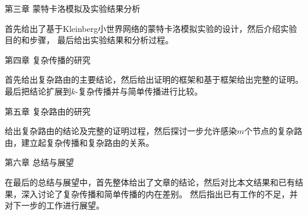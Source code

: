 第三章 蒙特卡洛模拟及实验结果分析

首先给出了基于Kleinberg小世界网络的蒙特卡洛模拟实验的设计，然后介绍实验目的和步骤，
最后给出实验结果和分析过程。

第四章 复杂传播的研究

首先给出复杂路由的主要结论，然后给出证明的框架和基于框架给出完整的证明。
最后把结论扩展到$k$-复杂传播并与简单传播进行比较。


第五章 复杂路由的研究

给出复杂路由的结论及完整的证明过程，然后探讨一步允许感染$m$个节点的复杂路由，建立起复杂传播和复杂路由的关系。

第六章 总结与展望

在最后的总结与展望中，首先整体给出了文章的结论，然后对比本文结果和已有结果，深入讨论了复杂传播和简单传播的内在差别。
然后指出已有工作的不足，并对下一步的工作进行展望。